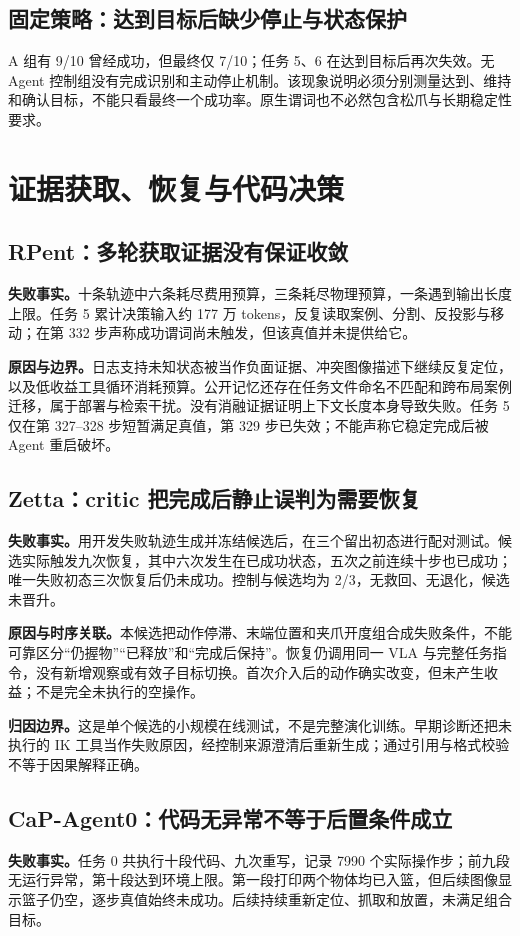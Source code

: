 \documentclass[UTF8,11pt,a4paper,fontset=none]{ctexart}
\begin{document}
\subsection*{固定策略：达到目标后缺少停止与状态保护}
A 组有 9/10 曾经成功，但最终仅 7/10；任务 5、6 在达到目标后再次失效。无 Agent 控制组没有完成识别和主动停止机制。该现象说明必须分别测量达到、维持和确认目标，不能只看最终一个成功率。原生谓词也不必然包含松爪与长期稳定性要求。

\clearpage\section{证据获取、恢复与代码决策}

\subsection*{RPent：多轮获取证据没有保证收敛}
\textbf{失败事实。}十条轨迹中六条耗尽费用预算，三条耗尽物理预算，一条遇到输出长度上限。任务 5 累计决策输入约 177 万 tokens，反复读取案例、分割、反投影与移动；在第 332 步声称成功谓词尚未触发，但该真值并未提供给它。

\textbf{原因与边界。}日志支持未知状态被当作负面证据、冲突图像描述下继续反复定位，以及低收益工具循环消耗预算。公开记忆还存在任务文件命名不匹配和跨布局案例迁移，属于部署与检索干扰。没有消融证据证明上下文长度本身导致失败。任务 5 仅在第 327--328 步短暂满足真值，第 329 步已失效；不能声称它稳定完成后被 Agent 重启破坏。

\subsection*{Zetta：critic 把完成后静止误判为需要恢复}
\textbf{失败事实。}用开发失败轨迹生成并冻结候选后，在三个留出初态进行配对测试。候选实际触发九次恢复，其中六次发生在已成功状态，五次之前连续十步也已成功；唯一失败初态三次恢复后仍未成功。控制与候选均为 2/3，无救回、无退化，候选未晋升。

\textbf{原因与时序关联。}本候选把动作停滞、末端位置和夹爪开度组合成失败条件，不能可靠区分“仍握物”“已释放”和“完成后保持”。恢复仍调用同一 VLA 与完整任务指令，没有新增观察或有效子目标切换。首次介入后的动作确实改变，但未产生收益；不是完全未执行的空操作。

\textbf{归因边界。}这是单个候选的小规模在线测试，不是完整演化训练。早期诊断还把未执行的 IK 工具当作失败原因，经控制来源澄清后重新生成；通过引用与格式校验不等于因果解释正确。

\subsection*{CaP-Agent0：代码无异常不等于后置条件成立}
\textbf{失败事实。}任务 0 共执行十段代码、九次重写，记录 7990 个实际操作步；前九段无运行异常，第十段达到环境上限。第一段打印两个物体均已入篮，但后续图像显示篮子仍空，逐步真值始终未成功。后续持续重新定位、抓取和放置，未满足组合目标。
\end{document}
